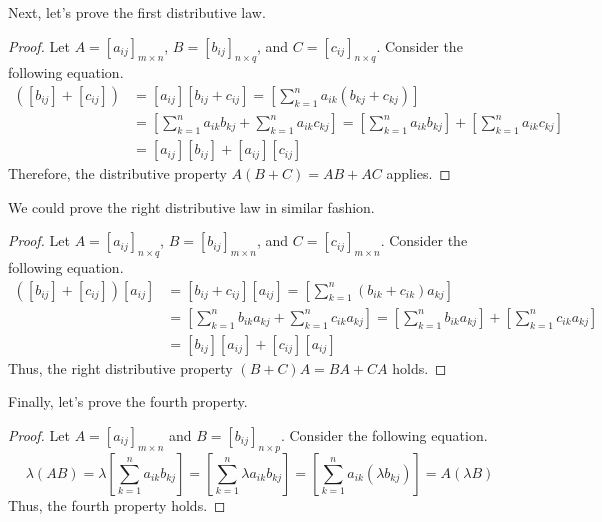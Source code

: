 \documentclass[../main.tex]{subfiles}
\begin{document}
Next, let's prove the first distributive law.

\begin{proof}
Let $A = [a_{ij}]_{m \times n}$, $B = [b_{ij}]_{n \times q}$,
and $C = [c_{ij}]_{n \times q}$. Consider the following equation.
\begin{align*}
    [a_{ij}] \left( [b_{ij}] + [c_{ij}] \right)
    &= [a_{ij}] [b_{ij} + c_{ij}]
    = \left[ \sum_{k=1}^{n} a_{ik} (b_{kj} + c_{kj}) \right] \\
    &= \left[
        \sum_{k=1}^{n} a_{ik} b_{kj} + \sum_{k=1}^{n} a_{ik} c_{kj}
    \right]
    = \left[ \sum_{k=1}^{n} a_{ik} b_{kj} \right]
        + \left[ \sum_{k=1}^{n} a_{ik} c_{kj} \right] \\
    &= [a_{ij}] [b_{ij}] + [a_{ij}] [c_{ij}]
\end{align*}
Therefore, the distributive property $A(B + C) = AB + AC$ applies.
\end{proof}

We could prove the right distributive law in similar fashion.

\begin{proof}
Let $A = [a_{ij}]_{n \times q}$, $B = [b_{ij}]_{m \times n}$,
and $C = [c_{ij}]_{m \times n}$. Consider the following equation.
\begin{align*}
    \left( [b_{ij}] + [c_{ij}] \right) [a_{ij}]
    &= [b_{ij} + c_{ij}] [a_{ij}]
    = \left[ \sum_{k=1}^{n} (b_{ik} + c_{ik}) a_{kj} \right] \\
    &= \left[
        \sum_{k=1}^{n} b_{ik} a_{kj} + \sum_{k=1}^{n} c_{ik} a_{kj}
    \right]
    = \left[ \sum_{k=1}^{n} b_{ik} a_{kj} \right]
        + \left[ \sum_{k=1}^{n} c_{ik} a_{kj} \right] \\
    &= [b_{ij}] [a_{ij}] + [c_{ij}] [a_{ij}]
\end{align*}
Thus, the right distributive property $(B + C)A = BA + CA$ holds.
\end{proof}

Finally, let's prove the fourth property.

\begin{proof}
Let $A = [a_{ij}]_{m \times n}$ and $B = [b_{ij}]_{n \times p}$.
Consider the following equation.
\[
\lambda (AB)
= \lambda \left[ \sum_{k = 1}^{n} a_{ik} b_{kj} \right]
= \left[ \sum_{k = 1}^{n} \lambda a_{ik} b_{kj} \right]
= \left[ \sum_{k = 1}^{n} a_{ik} (\lambda b_{kj}) \right]
= A(\lambda B)
\]
Thus, the fourth property holds.
\end{proof}
\end{document}
